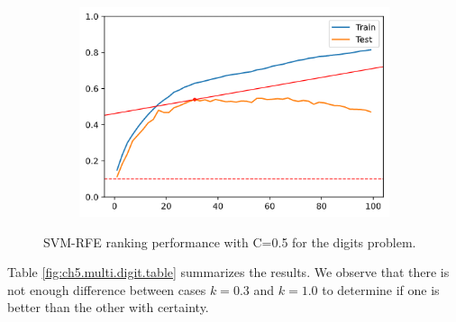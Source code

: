 \begin{figure}[h]
\begin{subfigure}[b]{0.4\linewidth}
    \end{subfigure}
    \begin{subfigure}[b]{0.4\linewidth}
        \includegraphics[width=\linewidth]{img/ch5/multi/w-coef.png}
    \end{subfigure}
    \caption{SVM-RFE ranking performance with C=0.5 for the digits problem.}
    \label{fig:ch5.multi.digit.plot}
\end{figure}

Table \ref{fig:ch5.multi.digit.table} summarizes the results. We observe that there is not enough difference between cases $k = 0.3$ and $k = 1.0$ to determine if one is better than the other with certainty. 

